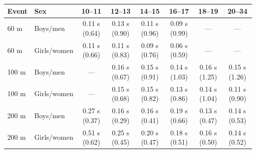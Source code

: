 \begin{tabular}{llcccccc}
\toprule
Event & Sex & 10--11 & 12--13 & 14--15 & 16--17 & 18--19 & 20--34 \\
\midrule
60 m & Boys/men & 0.11 s (0.64) & 0.13 s (0.90) & 0.11 s (0.96) & 0.09 s (0.99) & --- & --- \\
60 m & Girls/women & 0.11 s (0.66) & 0.11 s (0.83) & 0.09 s (0.76) & 0.06 s (0.59) & --- & --- \\
100 m & Boys/men & --- & 0.16 s (0.67) & 0.15 s (0.91) & 0.14 s (1.03) & 0.16 s (1.25) & 0.15 s (1.26) \\
100 m & Girls/women & --- & 0.15 s (0.68) & 0.15 s (0.82) & 0.13 s (0.86) & 0.14 s (1.04) & 0.11 s (0.90) \\
200 m & Boys/men & 0.27 s (0.37) & 0.16 s (0.29) & 0.16 s (0.41) & 0.19 s (0.66) & 0.13 s (0.47) & 0.14 s (0.53) \\
200 m & Girls/women & 0.51 s (0.62) & 0.25 s (0.45) & 0.20 s (0.47) & 0.18 s (0.51) & 0.16 s (0.50) & 0.14 s (0.52) \\
\bottomrule
\end{tabular}
